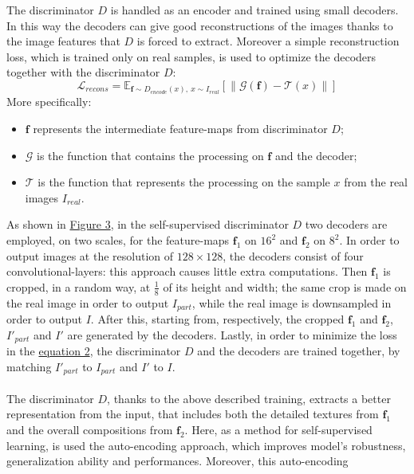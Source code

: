 \documentclass[12pt]{article}
\begin{document}
The discriminator $D$ is handled as an encoder and trained using small decoders. In this way the decoders can give good reconstructions
of the images thanks to the image features that $D$ is forced to extract. Moreover a simple reconstruction loss, which is 
trained only on real samples, is used to optimize the decoders together with the discriminator $D$:
\begin{equation}
	\label{eq:eq2}
	\mathcal{L}_{recons} = \mathbb{E}_{\mathbf{f} \sim D_{encode}(x),\ x \sim I_{real}}[\parallel \mathcal{G}(\mathbf{f}) - \mathcal{T}(x) \parallel]
\end{equation}
More specifically:
\begin{itemize}
	\setlength\itemsep{0.01em}
	\item {	
		$\mathbf{f}$ represents the intermediate feature-maps from discriminator $D$;
	}
	\item {
		$\mathcal{G}$ is the function that contains the processing on $\mathbf{f}$ and the decoder;
	}
	\item {
		$\mathcal{T}$ is the function that represents the processing on the sample $x$ from the real images $I_{real}$.
	}
\end{itemize} 
As shown in \hyperref[fig:fig3]{Figure 3}, in the self-supervised discriminator $D$ two decoders are employed, on two scales, for the
feature-maps $\mathbf{f}_1$ on $16^2$ and $\mathbf{f}_2$ on $8^2$. In order to output images at the resolution of $128 \times 128$,
the decoders consist of four convolutional-layers: this approach causes little extra computations.
Then $\mathbf{f}_1$ is cropped, in a random way, at $\frac{1}{8}$ of its height and width; the same crop is made on the real image
in order to output $I_{part}$, while the real image is downsampled in order to output $I$.
After this, starting from, respectively, the cropped $\mathbf{f}_1$ and $\mathbf{f}_2$, $I'_{part}$ and $I'$ are generated by the decoders.
Lastly, in order to minimize the loss in the \hyperref[eq:eq2]{equation 2}, the discriminator $D$ and the decoders are trained together, by
matching $I'_{part}$ to $I_{part}$ and $I'$ to $I$.\\\\
The discriminator $D$, thanks to the above described training, extracts a better representation from the input, that includes both the detailed
textures from $\mathbf{f}_1$ and the overall compositions from $\mathbf{f}_2$. Here, as a method for self-supervised learning, is used the 
auto-encoding approach, which improves model's robustness, generalization ability and performances. Moreover, this auto-encoding
\end{document}
